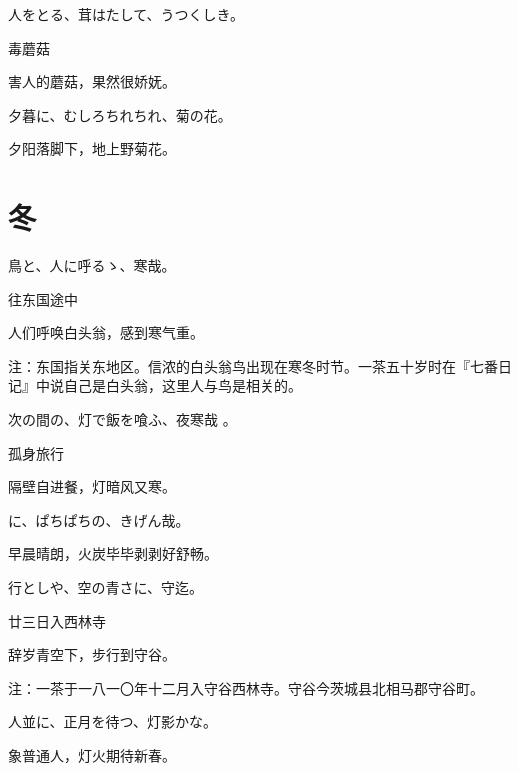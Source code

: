 \begin{haiku}
    {\FH 人をとる、茸はたして、うつくしき。}

    {\FK 毒蘑菇}

    {\FK 害人的蘑菇，果然很娇妩。}
\end{haiku}

\begin{haiku}
    {\FH 夕暮に、むしろちれちれ、菊の花。}

    {\FK 夕阳落脚下，地上野菊花。}
\end{haiku}

\section{\FK 冬}

\setcounter{haikucounter}{0}

\begin{haiku}
    {\FH {}鳥と、人に呼るゝ、寒哉。}

    {\FK 往东国途中}

    {\FK 人们呼唤白头翁，感到寒气重。}

    {\FT 注：东国指关东地区。信浓的白头翁鸟出现在寒冬时节。一茶五十岁时在『七番日记』中说自己是白头翁，这里人与鸟是相关的。}
\end{haiku}

\begin{haiku}
    {\FH 次の間の、灯で飯を喰ふ、夜寒哉 。}

    {\FK 孤身旅行}

    {\FK 隔壁自进餐，灯暗风又寒。}
\end{haiku}

\begin{haiku}
    {\FH {}に、ぱちぱちの、きげん哉。}

    {\FK 早晨晴朗，火炭毕毕剥剥好舒畅。}
\end{haiku}

\begin{haiku}
    {\FH 行としや、空の青さに、守迄。}

    {\FK 廿三日入西林寺}

    {\FK 辞岁青空下，步行到守谷。}

    {\FT 注：一茶于一八一〇年十二月入守谷西林寺。守谷今茨城县北相马郡守谷町。}
\end{haiku}

\begin{haiku}
    {\FH 人並に、正月を待つ、灯影かな。}

    {\FK 象普通人，灯火期待新春。}
\end{haiku}

